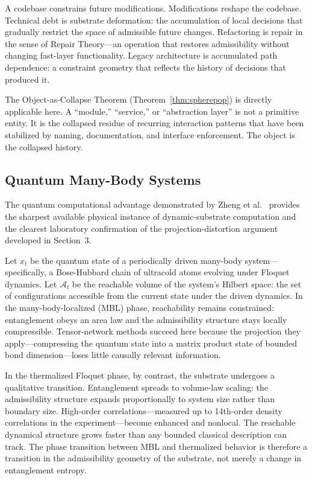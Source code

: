 \documentclass[12pt,a4paper]{article}
\begin{document}
A codebase constrains future modifications. Modifications reshape the codebase. Technical debt is substrate deformation: the accumulation of local decisions that gradually restrict the space of admissible future changes. Refactoring is repair in the sense of Repair Theory---an operation that restores admissibility without changing fast-layer functionality. Legacy architecture is accumulated path dependence: a constraint geometry that reflects the history of decisions that produced it.

The Object-as-Collapse Theorem (Theorem~\ref{thm:spherepop}) is directly applicable here. A ``module,'' ``service,'' or ``abstraction layer'' is not a primitive entity. It is the collapsed residue of recurring interaction patterns that have been stabilized by naming, documentation, and interface enforcement. The object is the collapsed history.

\subsection{Quantum Many-Body Systems}

The quantum computational advantage demonstrated by Zheng et al.~\cite{zheng2026} provides the sharpest available physical instance of dynamic-substrate computation and the clearest laboratory confirmation of the projection-distortion argument developed in Section~3.

Let $x_t$ be the quantum state of a periodically driven many-body system---specifically, a Bose-Hubbard chain of ultracold atoms evolving under Floquet dynamics. Let $\mathcal{A}_t$ be the reachable volume of the system's Hilbert space: the set of configurations accessible from the current state under the driven dynamics. In the many-body-localized (MBL) phase, reachability remains constrained: entanglement obeys an area law and the admissibility structure stays locally compressible. Tensor-network methods succeed here because the projection they apply---compressing the quantum state into a matrix product state of bounded bond dimension---loses little causally relevant information.

In the thermalized Floquet phase, by contrast, the substrate undergoes a qualitative transition. Entanglement spreads to volume-law scaling: the admissibility structure expands proportionally to system size rather than boundary size. High-order correlations---measured up to 14th-order density correlations in the experiment---become enhanced and nonlocal. The reachable dynamical structure grows faster than any bounded classical description can track. The phase transition between MBL and thermalized behavior is therefore a transition in the admissibility geometry of the substrate, not merely a change in entanglement entropy.
\end{document}

